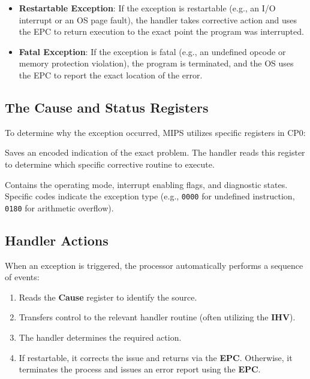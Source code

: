 \begin{itemize}
    \item \textbf{Restartable Exception}: If the exception is restartable (e.g., an I/O interrupt or an OS page fault), the handler takes corrective action and uses the EPC to return execution to the exact point the program was interrupted.
    \item \textbf{Fatal Exception}: If the exception is fatal (e.g., an undefined opcode or memory protection violation), the program is terminated, and the OS uses the EPC to report the exact location of the error.
\end{itemize}

\subsection{The Cause and Status Registers}
To determine why the exception occurred, MIPS utilizes specific registers in CP0:
\begin{definition}
Saves an encoded indication of the exact problem. The handler reads this register to determine which specific corrective routine to execute.
\end{definition}

\begin{definition}
Contains the operating mode, interrupt enabling flags, and diagnostic states. Specific codes indicate the exception type (e.g., \texttt{0000} for undefined instruction, \texttt{0180} for arithmetic overflow).
\end{definition}

\subsection{Handler Actions}
When an exception is triggered, the processor automatically performs a sequence of events:
\begin{enumerate}
    \item Reads the \textbf{Cause} register to identify the source.
    \item Transfers control to the relevant handler routine (often utilizing the \textbf{IHV}).
    \item The handler determines the required action.
    \item If restartable, it corrects the issue and returns via the \textbf{EPC}. Otherwise, it terminates the process and issues an error report using the \textbf{EPC}.
\end{enumerate}

